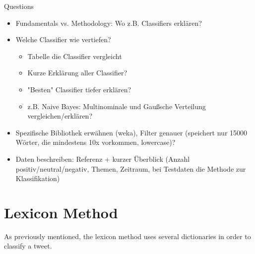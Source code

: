 Questions
\begin{itemize}
    \item Fundamentals vs. Methodology: Wo z.B. Classifiers erklären?
    \item Welche Classifier wie vertiefen?
    \begin{itemize}
    \item Tabelle die Classifier vergleicht
    \item Kurze Erklärung aller Classifier?
    \item "Besten" Classifier tiefer erklären?
    \item z.B. Naive Bayes: Multinominale und Gaußsche Verteilung vergleichen/erklären?
    \end{itemize}
    \item Spezifische Bibliothek erwähnen (weka), Filter genauer (speichert nur 15000 Wörter, die mindestens 10x vorkommen, lowercase)?
    \item Daten beschreiben: Referenz + kurzer Überblick (Anzahl positiv/neutral/negativ, Themen, Zeitraum, bei Testdaten die Methode zur Klassifikation)
\end{itemize}

\section{Lexicon Method}


As previously mentioned, the lexicon method uses several dictionaries in order to classify a tweet. 




